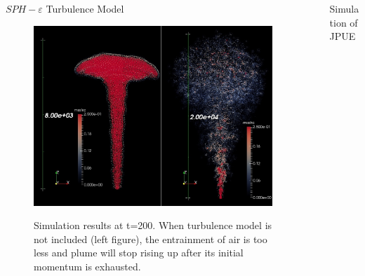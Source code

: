 \documentclass[final]{beamer}
\newlength{\sepwid}
\newlength{\onecolwid}
\newlength{\twocolwid}
\begin{document}
\begin{frame}[t]
\begin{columns}[t]
\begin{column}{\onecolwid}
\begin{block}{ $SPH-\varepsilon$ Turbulence Model \cite{monaghan2011turbulence}}
\begin{figure}
\centering
{\includegraphics[scale=0.85]{effect_of_turb_model}}
\caption{Simulation results at t=200. When turbulence model is not included (left figure), the entrainment of air is  too less and plume will stop rising up after its initial momentum is exhausted.}
\label{fig:effect_of_turbulence}
\end{figure}

\end{block}

\end{column} %


\begin{column}{\sepwid}\end{column} %

\begin{column}{\twocolwid} %

\begin{columns}[t,totalwidth=\twocolwid] %

\begin{column}{\onecolwid}\vspace{-1.4in} %

\begin{block}{Simulation of JPUE}


\end{block}
\end{column}
\end{columns}
\end{column}
\end{columns}
\end{frame}
\end{document}
